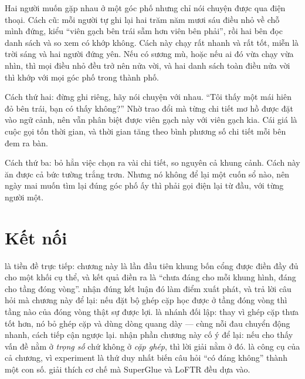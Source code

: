 \documentclass[../../deep_learning.tex]{subfiles}
\begin{document}
\begin{dongian}
Hai người muốn gặp nhau ở một góc phố nhưng chỉ nói chuyện được qua điện thoại. Cách cũ: mỗi người tự ghi lại hai trăm năm mươi sáu điều nhỏ về chỗ mình đứng, kiểu ``viên gạch bên trái sẫm hơn viên bên phải'', rồi hai bên đọc danh sách và so xem có khớp không. Cách này chạy rất nhanh và rất tốt, miễn là trời sáng và hai người đứng yên. Nếu có sương mù, hoặc nếu ai đó vừa chạy vừa nhìn, thì mọi điều nhỏ đều trở nên nửa vời, và hai danh sách toàn điều nửa vời thì khớp với mọi góc phố trong thành phố.

Cách thứ hai: đừng ghi riêng, hãy nói chuyện với nhau. ``Tôi thấy một mái hiên đỏ bên trái, bạn có thấy không?'' Nhờ trao đổi mà từng chi tiết mơ hồ được đặt vào ngữ cảnh, nên vẫn phân biệt được viên gạch này với viên gạch kia. Cái giá là cuộc gọi tốn thời gian, và thời gian tăng theo bình phương số chi tiết mỗi bên đem ra bàn.

Cách thứ ba: bỏ hẳn việc chọn ra vài chi tiết, so nguyên cả khung cảnh. Cách này ăn được cả bức tường trắng trơn. Nhưng nó không để lại một cuốn sổ nào, nên ngày mai muốn tìm lại đúng góc phố ấy thì phải gọi điện lại từ đầu, với từng người một.

\end{dongian}

\section{Kết nối}
 là tiền đề trực tiếp: chương này là lần đầu tiên khung bốn cổng được điền đầy đủ cho một khối cụ thể, và kết quả điền ra là ``chưa đáng cho mỗi khung hình, đáng cho tầng đóng vòng''.  nhận đúng kết luận đó làm điểm xuất phát, và trả lời câu hỏi mà chương này để lại: nếu đặt bộ ghép cặp học được ở tầng đóng vòng thì tầng nào của đóng vòng thật sự được lợi.  là nhánh đối lập: thay vì ghép cặp thưa tốt hơn, nó bỏ ghép cặp và dùng dòng quang dày --- cùng nỗi đau chuyển động nhanh, cách tiếp cận ngược lại.  nhận phần chương này cố ý để lại: nếu  cho thấy vấn đề nằm ở \emph{trọng số} chứ không ở \emph{cặp ghép}, thì lời giải nằm ở đó.  là công cụ của cả chương, vì  experiment là thứ duy nhất biến câu hỏi ``có đáng không'' thành một con số.  giải thích cơ chế  mà SuperGlue và LoFTR đều dựa vào.
\end{document}
